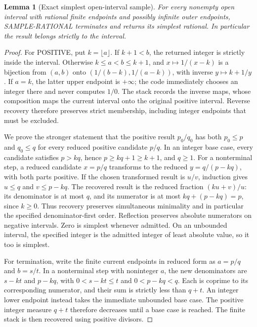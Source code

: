 \documentclass[11pt]{article}
\newtheorem{lemma}[theorem]{Lemma}
\theoremstyle{definition}
\begin{document}
\begin{lemma}[Exact simplest open-interval sample]\label{l:sampling}
For every nonempty open interval with rational finite endpoints and possibly
infinite outer endpoints, SAMPLE-RATIONAL terminates and returns its simplest
rational. In particular the result belongs strictly to the interval.
\end{lemma}
\begin{proof}
For POSITIVE, put $k=\lfloor a\rfloor$. If $k+1<b$, the returned integer
is strictly inside the interval. Otherwise $k\le a<b\le k+1$, and
$x\mapsto1/(x-k)$ is a bijection from $(a,b)$ onto
$(1/(b-k),1/(a-k))$, with inverse $y\mapsto k+1/y$.
If $a=k$, the latter upper endpoint is $+\infty$; the code immediately
chooses an integer there and never computes $1/0$.
The stack records the inverse maps, whose composition maps the current interval
onto the original positive interval. Reverse recovery therefore preserves strict
membership, including integer endpoints that must be excluded.

We prove the stronger statement that the positive result $p_0/q_0$ has both
$p_0\le p$ and $q_0\le q$ for every reduced positive candidate $p/q$.
In an integer base case, every candidate satisfies $p>kq$, hence
$p\ge kq+1\ge k+1$, and $q\ge1$.
For a nonterminal step, a reduced candidate $x=p/q$ transforms to the reduced
$y=q/(p-kq)$, with both parts positive. If the chosen transformed result
is $u/v$, induction gives $u\le q$ and $v\le p-kq$.
The recovered result is the reduced fraction $(ku+v)/u$:
its denominator is at most $q$, and its numerator is at most
$kq+(p-kq)=p$, since $k\ge0$.
Thus recovery preserves simultaneous minimality and in particular the specified
denominator-first order. Reflection preserves absolute numerators on negative
intervals. Zero is simplest whenever admitted. On an unbounded interval, the
specified integer is the admitted integer of least absolute value, so it too is
simplest.

For termination, write the finite current endpoints in reduced form as
$a=p/q$ and $b=s/t$. In a nonterminal step with noninteger $a$, the new
denominators are $s-kt$ and $p-kq$, with
$0<s-kt\le t$ and $0<p-kq<q$. Each is coprime to its corresponding
numerator, and their sum is strictly less than $q+t$.
An integer lower endpoint instead takes the immediate unbounded base case.
The positive integer measure $q+t$ therefore decreases until a base case is
reached. The finite stack is then recovered using positive divisors.
\end{proof}
\end{document}
